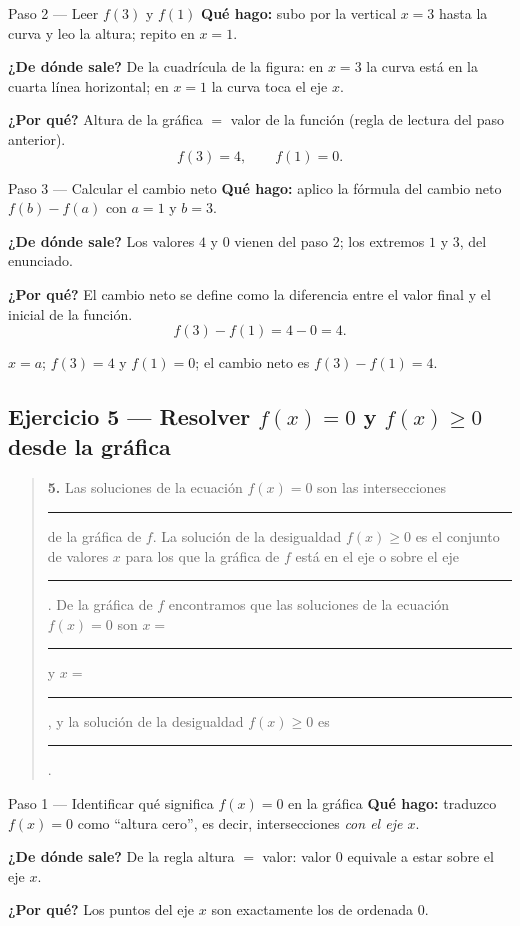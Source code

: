 \documentclass[11pt]{article}
\begin{document}
\begin{paso}{Paso 2 --- Leer $f(3)$ y $f(1)$}
\textbf{Qué hago:} subo por la vertical $x=3$ hasta la curva y leo la altura; repito en $x=1$.

\textbf{¿De dónde sale?} De la cuadrícula de la figura: en $x=3$ la curva está en la cuarta línea horizontal; en $x=1$ la curva toca el eje $x$.

\textbf{¿Por qué?} Altura de la gráfica $=$ valor de la función (regla de lectura del paso anterior).
\[
f(3)=4, \qquad f(1)=0.
\]
\end{paso}

\begin{paso}{Paso 3 --- Calcular el cambio neto}
\textbf{Qué hago:} aplico la fórmula del cambio neto $f(b)-f(a)$ con $a=1$ y $b=3$.

\textbf{¿De dónde sale?} Los valores $4$ y $0$ vienen del paso 2; los extremos $1$ y $3$, del enunciado.

\textbf{¿Por qué?} El cambio neto se define como la diferencia entre el valor final y el inicial de la función.
\[
f(3)-f(1)=4-0=4.
\]
\end{paso}

\begin{resp}
$x=a$; \; $f(3)=4$ y $f(1)=0$; \; el cambio neto es $f(3)-f(1)=4$.
\end{resp}

\subsection*{Ejercicio 5 — Resolver $f(x)=0$ y $f(x)\ge 0$ desde la gráfica}

\begin{quote}
\textbf{5.} Las soluciones de la ecuación $f(x)=0$ son las intersecciones \rule{1cm}{0.4pt} de la gráfica de $f$. La solución de la desigualdad $f(x)\ge 0$ es el conjunto de valores $x$ para los que la gráfica de $f$ está en el eje o sobre el eje \rule{0.8cm}{0.4pt}. De la gráfica de $f$ encontramos que las soluciones de la ecuación $f(x)=0$ son $x=$ \rule{0.8cm}{0.4pt} y $x=$ \rule{0.8cm}{0.4pt}, y la solución de la desigualdad $f(x)\ge 0$ es \rule{2.2cm}{0.4pt}.
\end{quote}

\begin{paso}{Paso 1 --- Identificar qué significa $f(x)=0$ en la gráfica}
\textbf{Qué hago:} traduzco $f(x)=0$ como ``altura cero'', es decir, intersecciones \emph{con el eje $x$}.

\textbf{¿De dónde sale?} De la regla altura $=$ valor: valor $0$ equivale a estar sobre el eje $x$.

\textbf{¿Por qué?} Los puntos del eje $x$ son exactamente los de ordenada $0$.
\end{paso}
\end{document}
